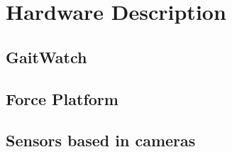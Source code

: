 \chapter{Hardware Description}
\label{ch:Hardware}

\section{GaitWatch}

\section{Force Platform}

\section{Sensors based in cameras}
